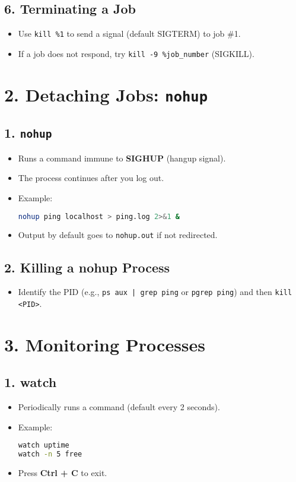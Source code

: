 \documentclass[a4paper]{report}
\begin{document}
\subsection*{6. Terminating a Job}
\begin{itemize}
    \item Use \texttt{kill \%1} to send a signal (default SIGTERM) to job \#1.
    \item If a job does not respond, try \texttt{kill -9 \%job\_number} (SIGKILL).
\end{itemize}

\section*{2. Detaching Jobs: \texttt{nohup}}

\subsection*{1. \texttt{nohup}}
\begin{itemize}
    \item Runs a command immune to \textbf{SIGHUP} (hangup signal).
    \item The process continues after you log out.
    \item Example:
\begin{lstlisting}[language=bash]
nohup ping localhost > ping.log 2>&1 &
\end{lstlisting}
    \item Output by default goes to \texttt{nohup.out} if not redirected.
\end{itemize}

\subsection*{2. Killing a nohup Process}
\begin{itemize}
    \item Identify the PID (e.g., \texttt{ps aux | grep ping} or \texttt{pgrep ping}) and then \texttt{kill <PID>}.
\end{itemize}

\section*{3. Monitoring Processes}

\subsection*{1. watch}
\begin{itemize}
    \item Periodically runs a command (default every 2 seconds).
    \item Example:
\begin{lstlisting}[language=bash]
watch uptime
watch -n 5 free
\end{lstlisting}
    \item Press \textbf{Ctrl + C} to exit.
\end{itemize}
\end{document}
